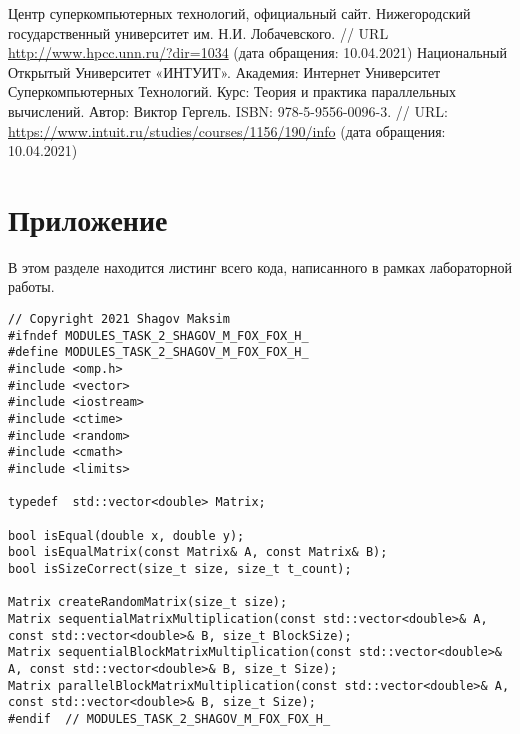\documentclass{report}
\begin{document}
\begin{thebibliography}{1}
 Центр суперкомпьютерных технологий, официальный сайт. Нижегородский
государственный университет им. Н.И. Лобачевского.  // URL \url {http://www.hpcc.unn.ru/?dir=1034} (дата обращения: 10.04.2021)
 Национальный Открытый Университет «ИНТУИТ». Академия: Интернет Университет Суперкомпьютерных Технологий. Курс: Теория и практика параллельных вычислений. Автор: Виктор Гергель. ISBN: 978-5-9556-0096-3. // URL: \url {https://www.intuit.ru/studies/courses/1156/190/info} (дата обращения: 10.04.2021)
\end{thebibliography}
\newpage

\section*{Приложение}
В этом разделе находится листинг всего кода, написанного в рамках лабораторной работы.
\begin{lstlisting}
// Copyright 2021 Shagov Maksim
#ifndef MODULES_TASK_2_SHAGOV_M_FOX_FOX_H_
#define MODULES_TASK_2_SHAGOV_M_FOX_FOX_H_
#include <omp.h>
#include <vector>
#include <iostream>
#include <ctime>
#include <random>
#include <cmath>
#include <limits>

typedef  std::vector<double> Matrix;

bool isEqual(double x, double y);
bool isEqualMatrix(const Matrix& A, const Matrix& B);
bool isSizeCorrect(size_t size, size_t t_count);

Matrix createRandomMatrix(size_t size);
Matrix sequentialMatrixMultiplication(const std::vector<double>& A, const std::vector<double>& B, size_t BlockSize);
Matrix sequentialBlockMatrixMultiplication(const std::vector<double>& A, const std::vector<double>& B, size_t Size);
Matrix parallelBlockMatrixMultiplication(const std::vector<double>& A, const std::vector<double>& B, size_t Size);
#endif  // MODULES_TASK_2_SHAGOV_M_FOX_FOX_H_

\end{lstlisting}
\end{document}
